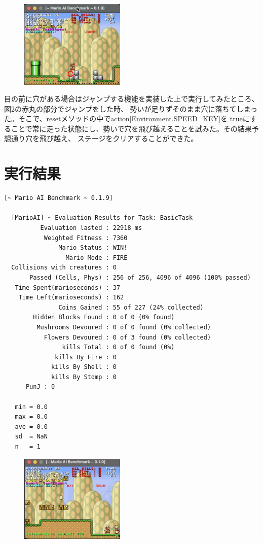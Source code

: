 \documentclass[a4paper,11pt]{jsarticle}
\begin{document}
\begin{figure}
  \begin{center}
    \includegraphics*[width=50mm]{images/report2/walking-jump.png}
    \caption[図2]{}
  \end{center}
\end{figure}

目の前に穴がある場合はジャンプする機能を実装した上で実行してみたところ、図2の赤丸の部分でジャンプをした時、
勢いが足りずそのまま穴に落ちてしまった。そこで、resetメソッドの中でaction[Environment.SPEED\_KEY]を
trueにすることで常に走った状態にし、勢いで穴を飛び越えることを試みた。その結果予想通り穴を飛び越え、
ステージをクリアすることができた。

\section*{実行結果}

\begin{lstlisting}[caption=実行結果]
  [~ Mario AI Benchmark ~ 0.1.9]

  [MarioAI] ~ Evaluation Results for Task: BasicTask
          Evaluation lasted : 22918 ms
           Weighted Fitness : 7360
               Mario Status : WIN!
                 Mario Mode : FIRE
  Collisions with creatures : 0
       Passed (Cells, Phys) : 256 of 256, 4096 of 4096 (100% passed)
   Time Spent(marioseconds) : 37
    Time Left(marioseconds) : 162
               Coins Gained : 55 of 227 (24% collected)
        Hidden Blocks Found : 0 of 0 (0% found)
         Mushrooms Devoured : 0 of 0 found (0% collected)
           Flowers Devoured : 0 of 3 found (0% collected)
                kills Total : 0 of 0 found (0%)
              kills By Fire : 0
             kills By Shell : 0
             kills By Stomp : 0
      PunJ : 0
  
   min = 0.0
   max = 0.0
   ave = 0.0
   sd  = NaN
   n   = 1
\end{lstlisting}

\begin{figure}
  \begin{center}
    \includegraphics*[width=50mm]{images/report2/reaching-goal.png}
  \end{center}
\end{figure}
\end{document}
